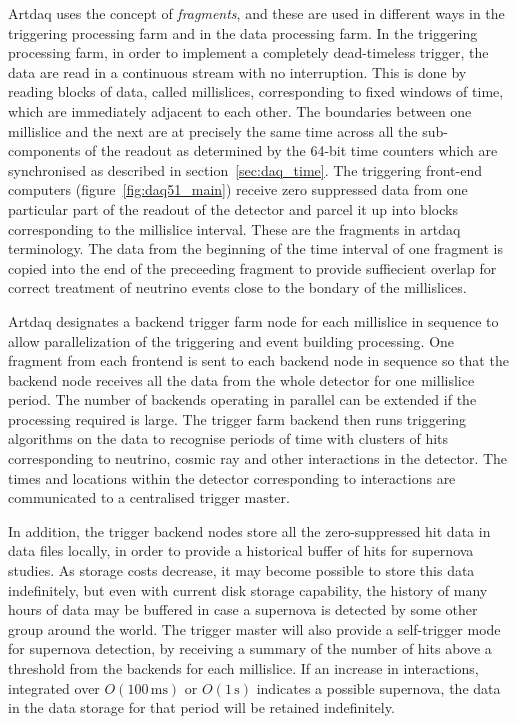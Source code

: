 Artdaq uses the concept of {\it fragments}, and these are used
in different ways in the triggering processing farm and in the data
processing farm.  In the triggering processing farm, in order to
implement a completely dead-timeless trigger, the data are read in a
continuous stream with no interruption.  This is done by reading
blocks of data, called millislices, corresponding to fixed windows of
time, which are immediately adjacent to each other.  The boundaries
between one millislice and the next are at precisely the same time
across all the sub-components of the readout as determined by the
64-bit time counters which are synchronised as described in
section~\ref{sec:daq_time}.  The triggering front-end computers
(figure~\ref{fig:daq51_main}) receive zero suppressed data from one
particular part of the readout of the detector and parcel it up into
blocks corresponding to the millislice interval.  These are the
fragments in artdaq terminology.  The data from the beginning of the
time interval of one fragment is copied into the end of the preceeding
fragment to provide suffiecient overlap for correct treatment of
neutrino events close to the bondary of the millislices.

Artdaq designates a backend trigger farm node for each millislice in
sequence to allow parallelization of the triggering and event building
processing.  One fragment from each frontend is sent to each backend
node in sequence so that the backend node receives all the data from
the whole detector for one millislice period.  The number of backends
operating in parallel can be extended if the processing required is
large. The trigger farm backend then runs triggering algorithms on the
data to recognise periods of time with clusters of hits corresponding
to neutrino, cosmic ray and other interactions in the detector.  The
times and locations within the detector corresponding to interactions
are communicated to a centralised trigger master.  

In addition, the trigger backend nodes store all the zero-suppressed
hit data in data files locally, in order to provide a historical
buffer of hits for supernova studies.  As storage costs decrease, it
may become possible to store this data indefinitely, but even with
current disk storage capability, the history of many hours of data may
be buffered in case a supernova is detected by some other group around
the world.  The trigger master will also provide a self-trigger mode
for supernova detection, by receiving a summary of the number of hits
above a threshold from the backends for each millislice.  If an
increase in interactions, integrated over $O(100\,\mathrm{ms})$ or
$O(1\,\mathrm{s})$ indicates a possible supernova, the data in the
data storage for that period will be retained indefinitely.


